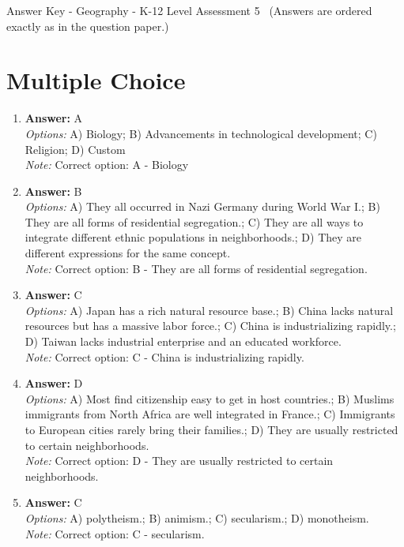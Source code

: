 \documentclass[12pt]{article}
\begin{document}
\begin{center}
Answer Key - Geography - K-12 Level Assessment 5 \
\small (Answers are ordered exactly as in the question paper.)
\end{center}

\section*{Multiple Choice}
\begin{enumerate}[label=\arabic*.]
\item \textbf{Answer:} A
\\ \textit{Options:} A) Biology; B) Advancements in technological development; C) Religion; D) Custom
\\ \textit{Note:} Correct option: A - Biology
\item \textbf{Answer:} B
\\ \textit{Options:} A) They all occurred in Nazi Germany during World War I.; B) They are all forms of residential segregation.; C) They are all ways to integrate different ethnic populations in neighborhoods.; D) They are different expressions for the same concept.
\\ \textit{Note:} Correct option: B - They are all forms of residential segregation.
\item \textbf{Answer:} C
\\ \textit{Options:} A) Japan has a rich natural resource base.; B) China lacks natural resources but has a massive labor force.; C) China is industrializing rapidly.; D) Taiwan lacks industrial enterprise and an educated workforce.
\\ \textit{Note:} Correct option: C - China is industrializing rapidly.
\item \textbf{Answer:} D
\\ \textit{Options:} A) Most find citizenship easy to get in host countries.; B) Muslims immigrants from North Africa are well integrated in France.; C) Immigrants to European cities rarely bring their families.; D) They are usually restricted to certain neighborhoods.
\\ \textit{Note:} Correct option: D - They are usually restricted to certain neighborhoods.
\item \textbf{Answer:} C
\\ \textit{Options:} A) polytheism.; B) animism.; C) secularism.; D) monotheism.
\\ \textit{Note:} Correct option: C - secularism.
\end{enumerate}
\end{document}
